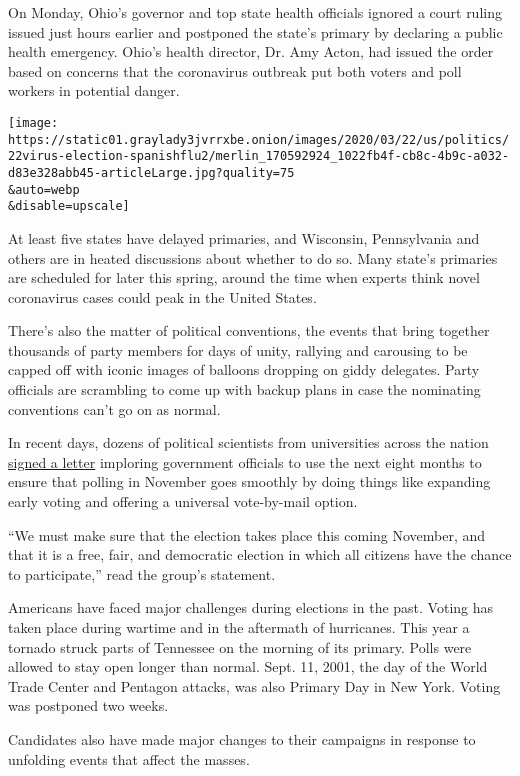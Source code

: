 On Monday, Ohio's governor and top state health officials ignored a
court ruling issued just hours earlier and postponed the state's primary
by declaring a public health emergency. Ohio's health director, Dr. Amy
Acton, had issued the order based on concerns that the coronavirus
outbreak put both voters and poll workers in potential danger.

\texttt{[image: https://static01.graylady3jvrrxbe.onion/images/2020/03/22/us/politics/22virus-election-spanishflu2/merlin\_170592924\_1022fb4f-cb8c-4b9c-a032-d83e328abb45-articleLarge.jpg?quality=75\\\&auto=webp\\\&disable=upscale]}

At least five states have delayed primaries, and Wisconsin, Pennsylvania
and others are in heated discussions about whether to do so. Many
state's primaries are scheduled for later this spring, around the time
when experts think novel coronavirus cases could peak in the United
States.

There's also the matter of political conventions, the events that bring
together thousands of party members for days of unity, rallying and
carousing to be capped off with iconic images of balloons dropping on
giddy delegates. Party officials are scrambling to come up with backup
plans in case the nominating conventions can't go on as normal.

In recent days, dozens of political scientists from universities across
the nation
\href{https://docs.google.com/forms/d/e/1FAIpQLSceYvQht71xf4Gb364HkqFXNKxD9R_KU0sTYerBIwK2gkfgsA/viewform}{signed
a letter} imploring government officials to use the next eight months to
ensure that polling in November goes smoothly by doing things like
expanding early voting and offering a universal vote-by-mail option.

``We must make sure that the election takes place this coming November,
and that it is a free, fair, and democratic election in which all
citizens have the chance to participate,'' read the group's statement.

Americans have faced major challenges during elections in the past.
Voting has taken place during wartime and in the aftermath of
hurricanes. This year a tornado struck parts of Tennessee on the morning
of its primary. Polls were allowed to stay open longer than normal.
Sept. 11, 2001, the day of the World Trade Center and Pentagon attacks,
was also Primary Day in New York. Voting was postponed two weeks.

Candidates also have made major changes to their campaigns in response
to unfolding events that affect the masses.

